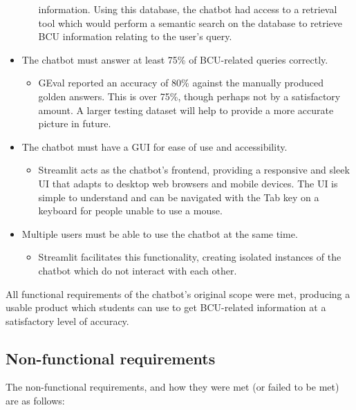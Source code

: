 \begin{itemize}
\begin{itemize}
        information. Using this database, the chatbot had access to a retrieval tool which would perform a semantic 
        search on the database to retrieve BCU information relating to the user's query.
    \end{itemize}
    \item The chatbot must answer at least 75\% of BCU-related queries correctly.
    \begin{itemize}
        \item GEval reported an accuracy of 80\% against the manually produced golden answers. This is over 75\%,
        though perhaps not by a satisfactory amount. A larger testing dataset will help to provide a more accurate 
        picture in future.
    \end{itemize}
    \item The chatbot must have a GUI for ease of use and accessibility.
    \begin{itemize}
        \item Streamlit acts as the chatbot's frontend, providing a responsive and sleek UI that adapts to 
        desktop web browsers and mobile devices. The UI is simple to understand and can be navigated with the 
        Tab key on a keyboard for people unable to use a mouse.
    \end{itemize}
    \item Multiple users must be able to use the chatbot at the same time.
    \begin{itemize}
        \item Streamlit facilitates this functionality, creating isolated instances of the chatbot which do not interact 
        with each other.
    \end{itemize}
\end{itemize}

\noindent All functional requirements of the chatbot's original scope were met, producing a usable product which students 
can use to get BCU-related information at a satisfactory level of accuracy. 

\subsection{Non-functional requirements}
The non-functional requirements, and how they were met (or failed to be met) are as follows:

